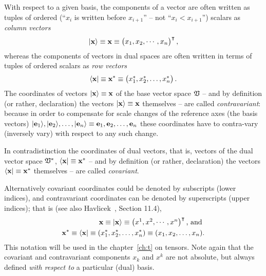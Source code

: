 With respect to a given basis,
the components of a vector are often written as tuples of ordered
(``$x_i$ is written before $x_{i+1}$'' -- not ``$x_i < x_{i+1}$'')
scalars  as {\em column vectors}
\begin{equation}
\vert {\bf x} \rangle
\equiv
{\bf x}
\equiv
\begin{pmatrix}
x_1,x_2,
\cdots ,
x_n
\end{pmatrix}^\intercal
,
\end{equation}
whereas the components of vectors in dual spaces are often written in terms of
tuples of ordered
scalars  as {\em row vectors}
\begin{equation}
\langle {\bf x} \vert
\equiv
{\bf x}^\ast \equiv
\begin{pmatrix}
x_1^\ast ,x_2^\ast ,\ldots , x_n^\ast
\end{pmatrix}
.
\end{equation}
The coordinates  of  vectors $\vert {\bf x} \rangle
\equiv
{\bf x}
$
of the base vector space ${\frak V}$
-- and by definition (or rather, declaration) the vectors $\vert {\bf x} \rangle
\equiv
{\bf x}
$ themselves --
are called
{\em contravariant}:
because in order to compensate for scale changes of the reference axes (the basis vectors)
$\vert {\bf e}_1 \rangle ,\vert  {\bf e}_2\rangle ,\ldots ,\vert {\bf e}_n\rangle
\equiv
{\bf e}_1, {\bf e}_2,\ldots ,{\bf e}_n$
these coordinates have to contra-vary (inversely vary)  with respect to any such change.

In contradistinction the coordinates of dual vectors,
that is, vectors of the dual vector space ${\frak V}^\ast$,
$\langle {\bf x} \vert
\equiv
{\bf x}^\ast $ -- and by definition (or rather, declaration) the vectors $\langle {\bf x} \vert
\equiv
{\bf x}^\ast $ themselves --
are called
{\em covariant}.

Alternatively covariant coordinates could be denoted by subscripts (lower indices),
and contravariant coordinates can be denoted by superscripts (upper indices); that is
(see also
Havlicek~\cite{havlicek-laftm}, Section 11.4),
\begin{equation}
\begin{split}
{\bf x}  \equiv
\vert {\bf x}  \rangle \equiv
\begin{pmatrix}
x^1,
x^2,
\cdots ,
x^n
\end{pmatrix}^\intercal
\textrm{, and }
\\
 {\bf x}^\ast \equiv
\langle {\bf x}  \vert \equiv
(x_1^\ast ,x_2^\ast ,\ldots , x_n^\ast  ) \equiv   (x_1,x_2,\ldots , x_n )
.
\end{split}
\end{equation}
This notation will be used in the chapter~\ref{ch:t} on tensors.
Note again that the covariant and contravariant components
$x_k$ and $x^k$ are not absolute, but always defined {\em with respect to}
a particular (dual) basis.


